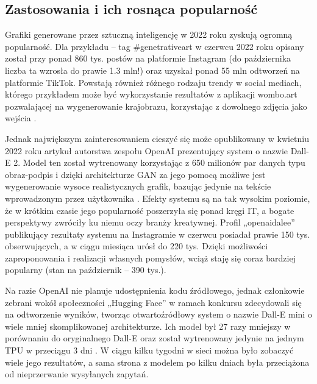 \documentclass[12pt]{article}
\begin{document}
\subsection{Zastosowania i ich rosnąca popularność}

\indent

Grafiki generowane przez sztuczną inteligencję w 2022 roku zyskują ogromną popularność. Dla przykładu – tag \#genetrativeart w czerwcu 2022 roku opisany został przy ponad 860 tys. postów na platformie Instagram (do października liczba ta wzrosła do prawie 1.3 mln!) oraz uzyskał ponad 55 mln odtworzeń na platformie TikTok. Powstają również różnego rodzaju trendy w social mediach, którego przykładem może być wykorzystanie rezultatów z aplikacji wombo.art pozwalającej na wygenerowanie krajobrazu, korzystając z dowolnego zdjęcia jako wejścia \cite{3}.

Jednak największym zainteresowaniem cieszyć się może opublikowany w kwietniu 2022 roku artykuł autorstwa zespołu OpenAI prezentujący system o nazwie Dall-E 2. Model ten został wytrenowany korzystając z 650 milionów par danych typu obraz-podpis i dzięki architekturze GAN za jego pomocą możliwe jest wygenerowanie wysoce realistycznych grafik, bazując jedynie na tekście wprowadzonym przez użytkownika \cite{4}. Efekty systemu są na tak wysokim poziomie, że w krótkim czasie jego popularność poszerzyła się ponad kręgi IT, a bogate perspektywy zwróciły ku niemu oczy branży kreatywnej. Profil „openaidalee” publikujący rezultaty systemu na Instagramie w czerwcu posiadał prawie 150 tys. obserwujących, a w ciągu miesiąca urósł do 220 tys. Dzięki możliwości zaproponowania i realizacji własnych pomysłów, wciąż staję się coraz bardziej popularny (stan na październik – 390 tys.).

Na razie OpenAI nie planuje udostępnienia kodu źródłowego, jednak członkowie zebrani wokół społeczności „Hugging Face” w ramach konkursu zdecydowali się na odtworzenie wyników, tworząc otwartoźródłowy system o nazwie Dall-E mini o wiele mniej skomplikowanej architekturze. Ich model był 27 razy mniejszy w porównaniu do oryginalnego Dall-E oraz został wytrenowany jedynie na jednym TPU w przeciągu 3 dni \cite{6}. W ciągu kilku tygodni w sieci można było zobaczyć wiele jego rezultatów, a sama strona z modelem po kilku dniach była przeciążona od nieprzerwanie wysyłanych zapytań.
\end{document}
